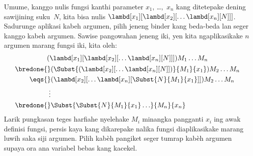 \documentclass[../../../include/open-logic-section]{subfiles}
\begin{document}
Umume, kanggo nulis fungsi kanthi parameter
$x_1$, \dots,~$x_n$ kang ditetepake
dening sawijining suku~$N$, kita bisa nulis
$\lambd[x_1][\lambd[x_2][\ldots\lambd[x_n][N]]]$.
Sadurunge aplikasi kabeh argumen, pilih jeneng binder kang beda-beda lan seger kanggo kabeh argumen. Sawise pangowahan jeneng iki, yen kita ngaplikasikake $n$ argumen
marang fungsi iki, kita oleh:
\begin{multline*}
  (\lambd[x_1][\lambd[x_2][\ldots\lambd[x_n][N]]]) M_1 \dots M_n \\
  \begin{aligned}
  \bredone {} & (\Subst{(\lambd[x_2][\ldots\lambd[x_n][N]])}{M_1}{x_1}) M_2
  \dots M_n\\
   \eqs {} & (\lambd[x_2][\ldots\lambd[x_n][\Subst{N}{M_1}{x_1}]]) M_2
            \dots M_n \\
  \vdots & \\
  \bredone {} &\Subst{\Subst{N}{M_1}{x_1}\ldots}{M_n}{x_n}
  \end{aligned}
\end{multline*}
Larik pungkasan teges harfiahe nyelehake
$M_i$ minangka pangganti $x_i$ ing awak
definisi fungsi, persis kaya kang dikarepake
nalika fungsi diaplikasikake marang luwih saka
siji argumen. Pilih kabèh pangiket seger tumrap kabèh argumen supaya ora ana variabel bebas kang kacekel.
\end{document}
